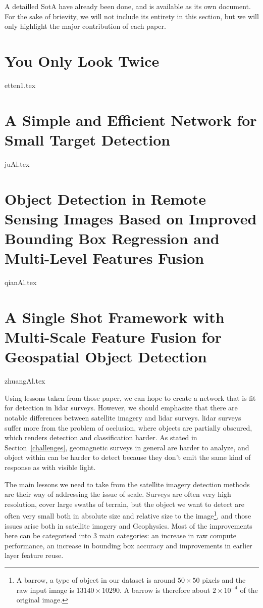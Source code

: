 A detailled SotA have already been done, and is available as its own document. For the sake of brievity, we will not include its entirety in this section, but we will only highlight the major contribution of each paper.

\section{You Only Look Twice\cite{yolt}}\label{yolt}
{etten1.tex}
\newpage


\section{A Simple and Efficient Network for Small Target Detection\cite{sen}}
{juAl.tex}
\newpage

\section{Object Detection in Remote Sensing Images Based on Improved Bounding Box Regression and Multi-Level Features Fusion\cite{qianAl}}\label{qianAl}
{qianAl.tex}
\newpage


\section{A Single Shot Framework with Multi-Scale Feature Fusion for Geospatial Object Detection\cite{zhuang2019}}\label{ssd}
{zhuangAl.tex}

Using lessons taken from those paper, we can hope to create a network that is fit for detection in \gls{lidar} surveys. However, we should emphasize that there are notable differences between satellite imagery and \gls{lidar} surveys. \gls{lidar} surveys suffer more from the problem of occlusion, where objects are partially obscured, which renders detection and classification harder. As stated in Section~\ref{challenges}, geomagnetic surveys in general are harder to analyze, and object within can be harder to detect because they don't emit the same kind of response as with visible light. 

The main lessons we need to take from the satellite imagery detection methods are their way of addressing the issue of scale. Surveys are often very high resolution, cover large swaths of terrain, but the object we want to detect are often very small both in absolute size and relative size to the image\footnote{A barrow, a type of object in our dataset is around $50 \times 50$ pixels and the raw input image is $13140 \times 10290$. A barrow is therefore about $2\times10^{-4}$ of the original image.}, and those issues arise both in satellite imagery and Geophysics. Most of the improvements here can be categorised into 3 main categories: an increase in raw compute performance, an increase in bounding box accuracy and improvements in earlier layer feature reuse. 
